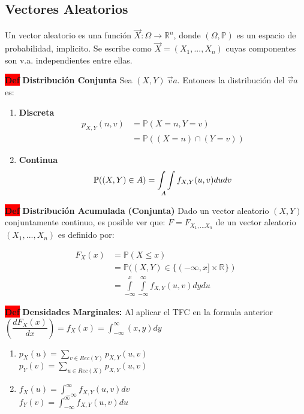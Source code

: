 \documentclass[letterpaper,10.5pt,twocolumn]{article} %
\newcommand{\R}[1][]{\mathbb{R}^{#1}}
\newcommand{\Proba}{\mathbb{P} }
\newcommand{\hlc}[2][yellow]{ \colorbox{#1}{#2} }
\newcommand{\Def}{\hlc[red]{\bfseries Def}}
\begin{document}
\subsection{Vectores Aleatorios}

Un vector aleatorio es una función $\vec{X}:\Omega \rightarrow \R[n] $, donde $(\Omega, \Proba)$ es un espacio de probabilidad, implicito. Se escribe como $\vec{X} = (X_1 , ... ,X_n )$ cuyas componentes son v.a. independientes entre ellas.

\Def \textbf{Distribución Conjunta} Sea $(X,Y)\ \vec{v}a$. Entonces la
distribución del $\vec{v}a$ es:

\begin{enumerate}[label={(\textit{\roman*})}, leftmargin=*, itemsep=0pt]
    \item \textbf{Discreta}
    \begin{align*}
        p_{X,Y} (n,v) &= \Proba (X=n,Y=v) \\
        &= \Proba((X = n) \cap (Y =v))
    \end{align*}
    \item \textbf{Continua} 
    \begin{equation*}
        \Proba ((X,Y)\in A) = \int\limits_{\ A\hspace{-6pt}}\int f_{X,Y} (u,v)dudv
    \end{equation*}
\end{enumerate}


\Def \textbf{Distribución Acumulada (Conjunta)} Dado un vector aleatorio $(X,Y )$ conjuntamente continuo, es posible ver que: $F = F_{X_1,...X_n} $ de un vector aleatorio $(X_1 ,...,X_n )$ es definido por:

\begin{align*}
    F_X(x) &= \Proba (X\leq x)\\ 
    &= \Proba ( (X,Y) \in \{(-\infty,x] \times \R \} ) \\
    &= \int\limits_{-\infty}^{x} \int\limits_{-\infty}^{\infty} f_{X,Y} (u,v) dy du
\end{align*}

\Def \textbf{Densidades Marginales:} Al aplicar el TFC en la formula anterior $\left(\dfrac{dF_X (x)}{dx}\right) = f_{X} (x) = \int_{-\infty}^{\infty} (x,y) dy$

\begin{enumerate}[label={(\textit{\roman*})}, leftmargin=*, itemsep=0pt]
    \item $p_X(u) = \sum_{v\in Rec(Y)} p_{X,Y}(u,v) $ \\ $p_Y(v) = \sum_{u\in Rec(X)} p_{X,Y}(u,v) $
    \item $f_X(u) = \int_{-\infty}^{\infty} f_{X,Y}(u,v)dv $ \\ $f_Y(v) = \int_{-\infty}^{\infty} f_{X,Y}(u,v)du $
\end{enumerate}
\end{document}
